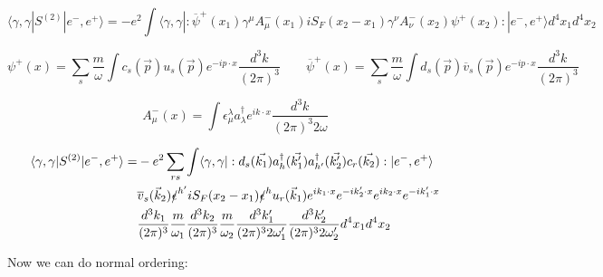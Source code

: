 \documentclass[a4]{article}
\begin{document}
        \begin{framed}

            \begin{equation}
                \langle \gamma, \gamma | S^{(2)} | e^{-}, e^{+} \rangle = -e^{2} \int \langle \gamma, \gamma |:\overline{\psi}^{+} (x_1) \gamma^{\mu} A_{\mu}^{-} (x_1) i S_{F} (x_2 - x_1) \gamma^{\nu} A_{\nu}^{-} (x_2) \psi^{+} (x_2):| e^{-}, e^{+} \rangle d^4 x_1 d^4 x_2
            \end{equation}

            \begin{equation}
                \psi^{+} (x) = \sum_{s} \frac{m}{\omega} \int c_{s} (\vec{p}) u_{s} (\vec{p}) e^{- i p \cdot x} \frac{d^3 k}{(2 \pi)^{3}} \qquad \overline{\psi}^{+} (x) = \sum_{s} \frac{m}{\omega} \int d_{s} (\vec{p}) \overline{v}_{s} (\vec{p}) e^{- i p \cdot x} \frac{d^3 k}{(2 \pi)^{3}}
            \end{equation}

            \begin{equation}
                A_{\mu}^{-} (x) = \int \epsilon^{\lambda}_{\mu} a^{\dagger}_{\lambda} e^{i k \cdot x} \frac{d^3 k}{(2 \pi)^{3} 2 \omega}
            \end{equation}

            \begin{equation}
                \begin{aligned}
                    \langle \gamma, \gamma | S^{(2)} | e^{-}, e^{+} \rangle = & - e^{2} \sum_{r s} \int \langle \gamma, \gamma |:d_{s} (\vec{k_1}) a^{\dagger}_{h} (\vec{k'_1}) a^{\dagger}_{h'} (\vec{k'_2}) c_{r} (\vec{k_2}):| e^{-}, e^{+} \rangle \\
                    & \overline{v}_{s} (\vec{k}_2) \slashed{\epsilon}^{h'} i S_{F} (x_2 - x_1) \slashed{\epsilon}^{h} u_{r} (\vec{k}_1) e^{i k_1 \cdot x} e^{- i k'_2 \cdot x} e^{i k_2 \cdot x} e^{- i k'_1 \cdot x} \\
                    & \frac{d^3 k_1}{(2 \pi)^{3}} \frac{m}{\omega_1} \frac{d^3 k_2}{(2 \pi)^{3}} \frac{m}{\omega_2} \frac{d^3 k'_1}{(2 \pi)^{3} 2 \omega'_1} \frac{d^3 k'_2}{(2 \pi)^{3} 2 \omega'_2} d^4 x_1 d^4 x_2
                \end{aligned}
            \end{equation}

            Now we can do normal ordering:


\end{framed}
\end{document}
